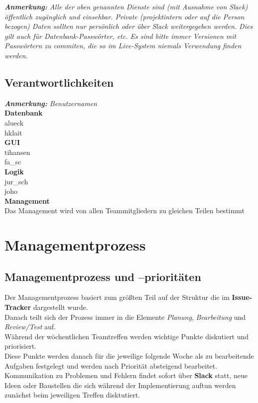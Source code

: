 \documentclass[fontsize=12pt,paper=a4,twoside]{scrartcl}
\begin{document}
	
	\textit{\textbf{Anmerkung:} Alle der oben genannten Dienste sind (mit Ausnahme von Slack) öffentlich zugänglich und einsehbar. Private (projektintern oder auf die Person bezogen) Daten sollten nur persönlich oder über Slack weitergegeben werden. Dies gilt auch für Datenbank-Passwörter, etc. Es sind bitte immer Versionen mit Passwörtern zu commiten, die so im Live-System niemals Verwendung finden werden.}

\subsection{Verantwortlichkeiten}
	
	\textit{\textbf{Anmerkung:} Benutzernamen}\\
	
	\textbf{Datenbank}\\
	alueck\\
	hklait\\
	
	\textbf{GUI}\\
	tihansen\\
	fa\_sc\\
	
	\textbf{Logik}\\
	jur\_sch\\
	joho\\
	
	\textbf{Management}\\
	Das Management wird von allen Teammitgliedern zu gleichen Teilen bestimmt
	

\section{Managementprozess}

\subsection{Managementprozess und --prioritäten}

	Der Managementprozess basiert zum größten Teil auf der Struktur die im \textbf{Issue-Tracker} dargestellt wurde.\\
	Danach teilt sich der Prozess immer in die Elemente \textit{Planung}, \textit{Bearbeitung} und \textit{Review/Test} auf.\\
	Während der wöchentlichen Teamtreffen werden wichtige Punkte diskutiert und priorisiert.\\
	Diese Punkte werden danach für die jeweilige folgende Woche als zu bearbeitende Aufgaben festgelegt und werden nach Priorität absteigend bearbeitet.\\
	Kommunikation zu Problemen und Fehlern findet sofort über \textbf{Slack} statt, neue Ideen oder Baustellen die sich während der Implementierung auftun werden zunächst beim jeweiligen Treffen disktutiert.\\
\end{document}
